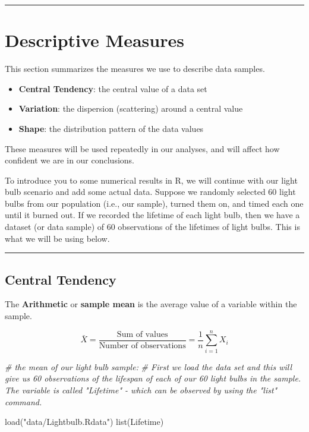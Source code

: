 \documentclass[
]{book}
\newenvironment{Shaded}{\begin{snugshade}}{\end{snugshade}}
\newcommand{\CommentTok}[1]{\textcolor[rgb]{0.56,0.35,0.01}{\textit{#1}}}
\newcommand{\FunctionTok}[1]{\textcolor[rgb]{0.00,0.00,0.00}{#1}}
\newcommand{\NormalTok}[1]{#1}
\newcommand{\StringTok}[1]{\textcolor[rgb]{0.31,0.60,0.02}{#1}}
\begin{document}
\begin{center}\rule{0.5\linewidth}{0.5pt}\end{center}

\hypertarget{descriptive-measures}{%
\section{Descriptive Measures}\label{descriptive-measures}}

This section summarizes the measures we use to describe data samples.

\begin{itemize}
\item
  \textbf{Central Tendency}: the central value of a data set
\item
  \textbf{Variation}: the dispersion (scattering) around a central value
\item
  \textbf{Shape}: the distribution pattern of the data values
\end{itemize}

These measures will be used repeatedly in our analyses, and will affect how confident we are in our conclusions.

To introduce you to some numerical results in R, we will continue with our light bulb scenario and add some actual data. Suppose we randomly selected 60 light bulbs from our population (i.e., our sample), turned them on, and timed each one until it burned out. If we recorded the lifetime of each light bulb, then we have a dataset (or data sample) of 60 observations of the lifetimes of light bulbs. This is what we will be using below.

\begin{center}\rule{0.5\linewidth}{0.5pt}\end{center}

\hypertarget{central-tendency}{%
\subsection{Central Tendency}\label{central-tendency}}

The \textbf{Arithmetic} or \textbf{sample mean} is the average value of a variable within the sample.

\[\bar{X}=\frac{\text{Sum of values}}{\text{Number of observations}}=\frac{1}{n} \sum\limits_{i=1}^n X_i\]

\begin{Shaded}
\begin{Highlighting}[]
\CommentTok{\# the mean of our light bulb sample:}
\CommentTok{\# First we load the data set and this will give us 60 observations of the lifespan of each of our 60 light bulbs in the sample. The variable is called "Lifetime" {-} which can be observed by using the "list" command.}

\FunctionTok{load}\NormalTok{(}\StringTok{"data/Lightbulb.Rdata"}\NormalTok{)}
\FunctionTok{list}\NormalTok{(Lifetime)}
\end{Highlighting}
\end{Shaded}
\end{document}
